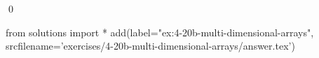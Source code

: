 
\begin{ex} 
  \label{ex:4-20b-multi-dimensional-arrays}
  
  \qed
\end{ex} 
\begin{python0}
from solutions import *
add(label="ex:4-20b-multi-dimensional-arrays",
    srcfilename='exercises/4-20b-multi-dimensional-arrays/answer.tex') 
\end{python0}
